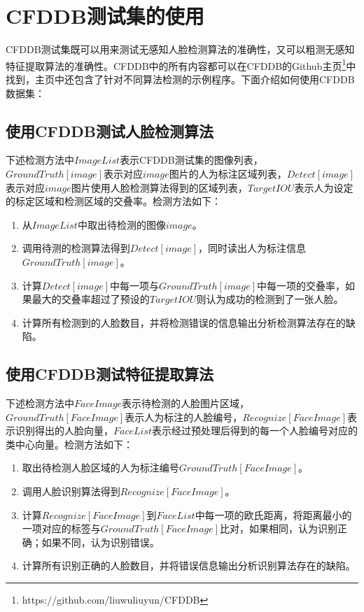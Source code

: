 \section{CFDDB测试集的使用}

CFDDB测试集既可以用来测试无感知人脸检测算法的准确性，又可以粗测无感知特征提取算法的准确性。CFDDB中的所有内容都可以在CFDDB的Github主页\footnote{https://github.com/liuwuliuyun/CFDDB}中找到，主页中还包含了针对不同算法检测的示例程序。下面介绍如何使用CFDDB数据集：

\subsection{使用CFDDB测试人脸检测算法}

下述检测方法中$ImageList$表示CFDDB测试集的图像列表，$GroundTruth[image]$表示对应$image$图片的人为标注区域列表，$Detect[image]$表示对应$image$图片使用人脸检测算法得到的区域列表，$TargetIOU$表示人为设定的标定区域和检测区域的交叠率。检测方法如下：

\begin{enumerate}
	\item 从$ImageList$中取出待检测的图像$image$。
	\item 调用待测的检测算法得到$Detect[image]$，同时读出人为标注信息$GroundTruth[image]$。
	\item 计算$Detect[image]$中每一项与$GroundTruth[image]$中每一项的交叠率，如果最大的交叠率超过了预设的$TargetIOU$则认为成功的检测到了一张人脸。
	\item 计算所有检测到的人脸数目，并将检测错误的信息输出分析检测算法存在的缺陷。
\end{enumerate}

\subsection{使用CFDDB测试特征提取算法}

下述检测方法中$FaceImage$表示待检测的人脸图片区域，$GroundTruth[FaceImage]$表示人为标注的人脸编号，$Recognize[FaceImage]$表示识别得出的人脸向量，$FaceList$表示经过预处理后得到的每一个人脸编号对应的类中心向量。检测方法如下：

\begin{enumerate}
	\item 取出待检测人脸区域的人为标注编号$GroundTruth[FaceImage]$。
	\item 调用人脸识别算法得到$Recognize[FaceImage]$。
	\item 计算$Recognize[FaceImage]$到$FaceList$中每一项的欧氏距离，将距离最小的一项对应的标签与$GroundTruth[FaceImage]$比对，如果相同，认为识别正确；如果不同，认为识别错误。
	\item 计算所有识别正确的人脸数目，并将错误信息输出分析识别算法存在的缺陷。
\end{enumerate}

